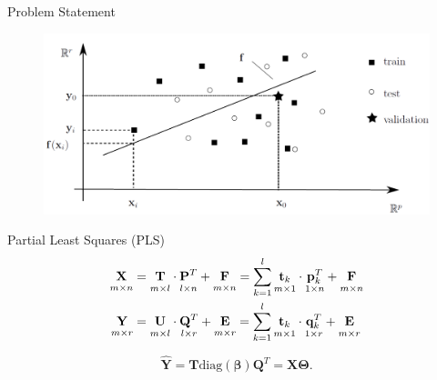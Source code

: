 \documentclass[9pt]{beamer}
\newcommand{\bY}{\mathbf{Y}}
\newcommand{\bX}{\mathbf{X}}
\newcommand{\bt}{\mathbf{t}}
\newcommand{\bp}{\mathbf{p}}
\newcommand{\bq}{\mathbf{q}}
\newcommand{\bP}{\mathbf{P}}
\newcommand{\bT}{\mathbf{T}}
\newcommand{\bQ}{\mathbf{Q}}
\newcommand{\bE}{\mathbf{E}}
\newcommand{\bF}{\mathbf{F}}
\newcommand{\bU}{\mathbf{U}}
\newcommand{\bTheta}{\boldsymbol{\Theta}}
\begin{document}
\begin{frame}{Problem Statement}
\begin{minipage}{0.6\linewidth}
	\begin{figure}
		\includegraphics[width=1.1\linewidth]{figs/forecast_scheme}
	\end{figure}
	\begin{block}{Partial Least Squares (PLS)}
	\vspace{-0.5cm}
	\begin{align*}
		\underset{m \times n}{\vphantom{\bQ}\bX} 
		&= \underset{m \times l}{\vphantom{\bQ}\bT} \cdot \underset{l \times n}{\vphantom{\bQ}\bP^{T}} + \underset{m \times n}{\vphantom{\bQ}\bF} 
		= \sum_{k=1}^l \underset{m \times 1}{\vphantom{\bp_k^{T}}\bt_k} \cdot \underset{1 \times n}{\bp_k^{T}} + \underset{m \times n}{\vphantom{\bp_k^{T}}\bF}\\
		\underset{m \times r}{\vphantom{\bQ}\bY} 
		&= \underset{m \times l}{\vphantom{\bQ}\bU} \cdot \underset{l \times r}{\bQ^{T}} + \underset{m \times r}{\vphantom{\bQ}\bE}
		=  \sum_{k=1}^l  \underset{m \times 1}{\vphantom{\bq_k^{T}}\bt_k} \cdot \underset{1 \times r}{\bq_k^{T}} +  \underset{m \times r}{\vphantom{\bq_k^{T}}\bE}
	\end{align*}
	\end{block}
	\begin{equation*}
		\mathbf{\hat{Y}} = \mathbf{T}\text{diag}(\boldsymbol{\beta}) \bQ^{T} = \bX \bTheta.
	\end{equation*}
\end{minipage}%
\begin{minipage}{0.4\linewidth}
	

\end{minipage}
\end{frame}
\end{document}
